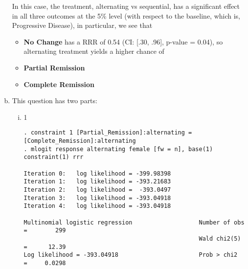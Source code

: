 \documentclass{article}
\begin{document}
\begin{enumerate}[a.]
In this case, the treatment, alternating vs sequential, has a significant effect in all three outcomes at the 5\% level (with respect to the baseline, which is, Progressive Disease), in particular, we see that 

\begin{itemize}
	\item \textbf{No Change} has a RRR of 0.54 (CI: [.30, .96], p-value = 0.04), so alternating treatment yields a higher chance of 
	\item \textbf{Partial Remission}
	\item \textbf{Complete Remission}
\end{itemize}

\item This question has two parts:

\begin{enumerate}[i.]
	\item 1
	
\begin{verbatim}
. constraint 1 [Partial_Remission]:alternating = [Complete_Remission]:alternating
. mlogit response alternating female [fw = n], base(1) constraint(1) rrr

Iteration 0:   log likelihood = -399.98398  
Iteration 1:   log likelihood = -393.21683  
Iteration 2:   log likelihood =  -393.0497  
Iteration 3:   log likelihood = -393.04918  
Iteration 4:   log likelihood = -393.04918  

Multinomial logistic regression                   Number of obs   =        299
                                                  Wald chi2(5)    =      12.39
Log likelihood = -393.04918                       Prob > chi2     =     0.0298


\end{verbatim}
\end{enumerate}
\end{enumerate}
\end{document}
